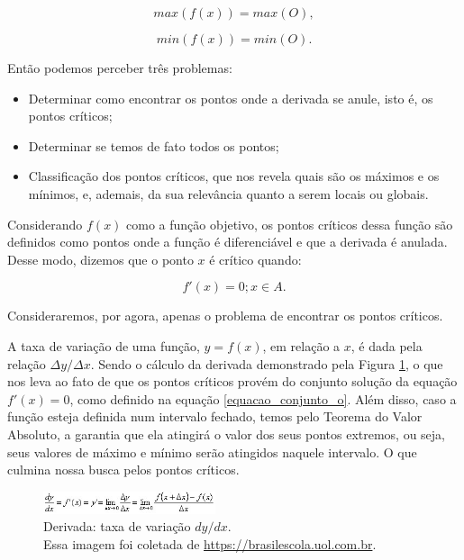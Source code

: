 \begin{equation}
    max(f(x)) = max(O),
\end{equation}

\begin{equation}
    min(f(x)) = min(O).
\end{equation}


Então podemos perceber três problemas:

\begin{itemize}
  \item Determinar como encontrar os pontos onde a derivada se anule, isto é,
    os pontos críticos;
  \item Determinar se temos de fato todos os pontos;
  \item Classificação dos pontos críticos, que nos revela quais são os máximos e
  os mínimos, e, ademais, da sua relevância quanto a serem locais ou globais.
\end{itemize}


\begin{definition}
    Considerando $f(x)$ como a função objetivo, os pontos críticos dessa função
    são definidos como pontos onde a função é diferenciável e que a derivada é
    anulada. Desse modo, dizemos que o ponto $x$ é crítico quando:

    \begin{equation}
        f'(x) = 0; x \in A.
    \end{equation}

\end{definition}


Consideraremos, por agora, apenas o problema de encontrar os pontos críticos.

A taxa de variação de uma função, \(y=f(x)\), em relação a \(x\), é dada pela
relação \(\Delta y / \Delta x\). Sendo o cálculo da derivada
demonstrado pela Figura \ref{derivada_padrao}, o que nos leva ao fato de que
os pontos críticos provém do conjunto solução da equação \(f'(x) = 0\), como
definido na equação \ref{equacao_conjunto_o}. Além disso, caso a função esteja
definida num intervalo fechado, temos pelo Teorema do Valor Absoluto, a
garantia que ela atingirá o valor dos seus pontos extremos, ou seja, seus
valores de máximo e mínimo serão atingidos naquele intervalo. O que culmina
nossa busca pelos pontos críticos.

\begin{figure}[h]
    \centering
    \includegraphics[width=0.45\textwidth]{src/derivada_padrao.jpg}
    \captionsetup{justification=centering}
    \caption{
        Derivada: taxa de variação \(dy/dx\).\\
        \tiny Essa imagem foi coletada de \url{https://brasilescola.uol.com.br}.
    }
    \label{derivada_padrao}
\end{figure}

